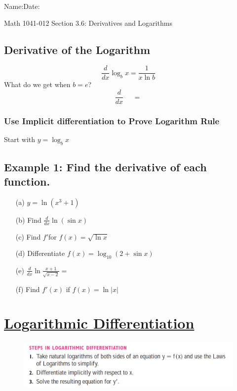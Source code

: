 \documentclass[12pt]{book}
\theoremstyle{definition}
\begin{document}
\begin{flushleft}
Name:\underline{\hspace{13cm}}Date:\underline{\hspace{2cm}}
\end{flushleft}
\begin{center}
{\Large Math 1041-012 \hspace{0.5cm} Section 3.6: Derivatives and Logarithms}
\end{center}
\begin{tcolorbox}
\subsection*{Derivative of the Logarithm}
\[
\frac{d}{dx}\log_b x=\frac{1}{x\ln b}
\]
What do we get when $b=e$?
\[
\frac{d}{dx}\ \ \ \ \ \ =
\]
\end{tcolorbox}
\subsubsection*{Use Implicit differentiation to Prove Logarithm Rule}
Start with $y=\log_b x$\vspace{5cm}
\subsection*{Example 1: Find the derivative of each function.}
\begin{itemize}
    \item[(a)] $y=\ln(x^3+1)$\vspace{4cm}
    \item[(b)] Find $\displaystyle\frac{d}{dx}\ln(\sin x)$\vspace{4cm}
    \item[(c)] Find $f'$for $f(x)=\sqrt{\ln x}$\vspace{5cm}
    \item[(d)] Differentiate $f(x)=\log_{10}(2+\sin x)$\vspace{5cm}
    \item[(e)]$\displaystyle\frac{d}{dx}\ln\frac{x+1}{\sqrt{x-2}}=$\vspace{5cm}
    \item[(f)] Find $f'(x)$ if $f(x)=\ln |x|$
\end{itemize}
\raggedbottom
\clearpage
\section*{\underline{Logarithmic Differentiation}}
\begin{figure}[h!]
    \centering
    \includegraphics{fig1.png}
\end{figure}
\end{document}
